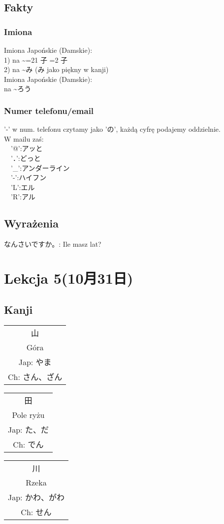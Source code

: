 \documentclass[10pt, a4paper]{article}
\newcommand{\kanji}[4]{
	\begin{tabular}{c}
		{\fontsize{50}{60}\selectfont #1} \\
		#2 \\
		Jap: #3 \\
		Ch: #4 \\
	\end{tabular}
}
\def\isFurigana{1}
\newcommand{\fur}[3][2]{\ifnum2=#1\if\isFurigana1
			\ruby{#2}{#3}
		\else
			#2
		\fi
	\else
		\ifnum1=#1
			\ruby{#2}{#3}
		\else
			#2
		\fi
	\fi
}
\begin{document}
	\subsection{Fakty}
	\subsubsection{Imiona}
	Imiona Japońskie (Damskie): \\
	1) na \textasciitilde\fur{子}{こ}　\\
	2) na \textasciitilde{み} (み jako piękny w kanji) \\
	Imiona Japońskie (Damskie): \\
	na \textasciitilde{ろう} 
	\subsubsection{Numer telefonu/email}
	'-' w num. telefonu czytamy jako 'の', każdą cyfrę podajemy oddzielnie. \\
	W mailu zaś: \\
	　'@':アッと \\
	　'．':どっと \\
	　'\_':アンダーライン \\
	　'-':ハイフン \\
	　'L':エル \\
	　'R':アル 
	\subsection{Wyrażenia}
	なんさいですか。: Ile masz lat?
	\newpage
	\section{Lekcja 5(10月31日)}
	\subsection{Kanji}
	\kanji{山}{Góra}{やま}{さん、ざん}
	\kanji{田}{Pole ryżu}{た、だ}{でん}
	\kanji{川}{Rzeka}{かわ、がわ}{せん}
\end{document}

